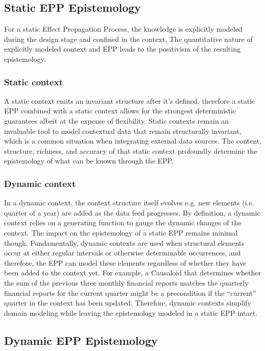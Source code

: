 \documentclass{article}
\begin{document}
\subsection{Static EPP Epistemology}
\label{subsec:Static_EPP}

For a static Effect Propagation Process, the knowledge is explicitly modeled during the design stage and confined in the context. The quantitative nature of explicitly modeled context and EPP leads to the positivism of the resulting epistemology.

\subsubsection{Static context}

A static context emits an invariant structure after it's defined, therefore a static EPP combined with a static context allows for the strongest deterministic guarantees albeit at the expense of flexibility. Static contexts remain an invaluable tool to model contextual data that remain structurally invariant, which is a common situation when integrating external data sources. The content, structure, richness, and accuracy of that static context profoundly determine the epistemology of what can be known through the EPP.

\subsubsection{Dynamic context}

In a dynamic context, the context structure itself evolves e.g. new elements (i.e. quarter of a year) are added as the data feed progresses. By definition, a dynamic context relies on a generating function to gauge the dynamic changes of the context. The impact on the epistemology of a static EPP remains minimal though. Fundamentally, dynamic contexts are used when structural elements occur at either regular intervals or otherwise determinable occurrences, and therefore, the EPP can model these elements regardless of whether they have been added to the context yet. For example, a Causaloid that determines whether the sum of the previous three monthly financial reports matches the quarterly financial reports for the current quarter might be a precondition if the “current” quarter in the context has been updated. Therefore, dynamic contexts simplify domain modeling while leaving the epistemology modeled in a static EPP intact.

\subsection{Dynamic EPP Epistemology}
\label{subsec:Dynamic_EPP}
\end{document}
